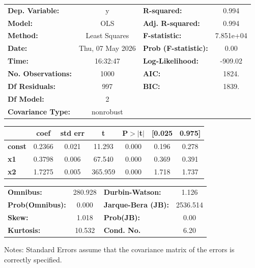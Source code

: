 \begin{center}
\begin{tabular}{lclc}
\toprule
\textbf{Dep. Variable:}    &        y         & \textbf{  R-squared:         } &     0.994   \\
\textbf{Model:}            &       OLS        & \textbf{  Adj. R-squared:    } &     0.994   \\
\textbf{Method:}           &  Least Squares   & \textbf{  F-statistic:       } & 7.851e+04   \\
\textbf{Date:}             & Thu, 07 May 2026 & \textbf{  Prob (F-statistic):} &     0.00    \\
\textbf{Time:}             &     16:32:47     & \textbf{  Log-Likelihood:    } &   -909.02   \\
\textbf{No. Observations:} &        1000      & \textbf{  AIC:               } &     1824.   \\
\textbf{Df Residuals:}     &         997      & \textbf{  BIC:               } &     1839.   \\
\textbf{Df Model:}         &           2      & \textbf{                     } &             \\
\textbf{Covariance Type:}  &    nonrobust     & \textbf{                     } &             \\
\bottomrule
\end{tabular}
\begin{tabular}{lcccccc}
               & \textbf{coef} & \textbf{std err} & \textbf{t} & \textbf{P$> |$t$|$} & \textbf{[0.025} & \textbf{0.975]}  \\
\midrule
\textbf{const} &       0.2366  &        0.021     &    11.293  &         0.000        &        0.196    &        0.278     \\
\textbf{x1}    &       0.3798  &        0.006     &    67.540  &         0.000        &        0.369    &        0.391     \\
\textbf{x2}    &       1.7275  &        0.005     &   365.959  &         0.000        &        1.718    &        1.737     \\
\bottomrule
\end{tabular}
\begin{tabular}{lclc}
\textbf{Omnibus:}       & 280.928 & \textbf{  Durbin-Watson:     } &    1.126  \\
\textbf{Prob(Omnibus):} &   0.000 & \textbf{  Jarque-Bera (JB):  } & 2536.514  \\
\textbf{Skew:}          &   1.018 & \textbf{  Prob(JB):          } &     0.00  \\
\textbf{Kurtosis:}      &  10.532 & \textbf{  Cond. No.          } &     6.20  \\
\bottomrule
\end{tabular}
\end{center}

Notes: \newline
 [1] Standard Errors assume that the covariance matrix of the errors is correctly specified.